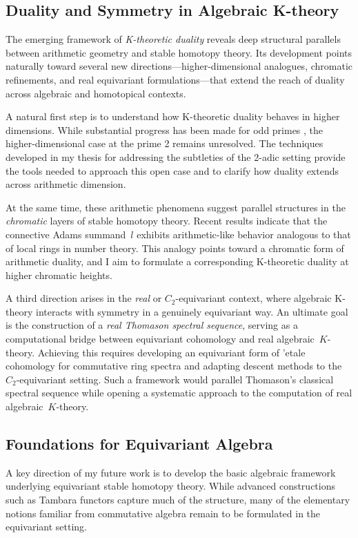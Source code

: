 \documentclass[11pt]{article}
\begin{document}
\subsection*{Duality and Symmetry in Algebraic K-theory}
The emerging framework of {\it K-theoretic duality} reveals deep structural parallels between arithmetic geometry and stable homotopy theory.
Its development points naturally toward several new directions—higher-dimensional analogues, chromatic refinements, and real equivariant formulations—that extend the reach of duality across algebraic and homotopical contexts.

A natural first step is to understand how K-theoretic duality behaves in higher dimensions.
While substantial progress has been made for odd primes \cite{Braunling}, the higher-dimensional case at the prime 2 remains unresolved.
The techniques developed in my thesis for addressing the subtleties of the 2-adic setting provide the tools needed to approach this open case and to clarify how duality extends across arithmetic dimension.

At the same time, these arithmetic phenomena suggest parallel structures in the {\it chromatic} layers of stable homotopy theory.
Recent results \cite{HRW} indicate that the connective Adams summand~$l$ exhibits arithmetic-like behavior analogous to that of local rings in number theory.
This analogy points toward a chromatic form of arithmetic duality, and I aim to formulate a corresponding K-theoretic duality at higher chromatic heights.

A third direction arises in the {\it real} or $C_2$-equivariant context, where algebraic K-theory interacts with symmetry in a genuinely equivariant way.
An ultimate goal is the construction of a {\it real Thomason spectral sequence}, serving as a computational bridge between equivariant cohomology and real algebraic~$K$-theory.
Achieving this requires developing an equivariant form of 'etale cohomology for commutative ring spectra and adapting descent methods to the $C_2$-equivariant setting.
Such a framework would parallel Thomason’s classical spectral sequence while opening a systematic approach to the computation of real algebraic~$K$-theory.


\subsection*{Foundations for Equivariant Algebra}
A key direction of my future work is to develop the basic algebraic framework underlying equivariant stable homotopy theory.
While advanced constructions such as Tambara functors capture much of the structure, many of the elementary notions familiar from commutative algebra remain to be formulated in the equivariant setting.
\end{document}
